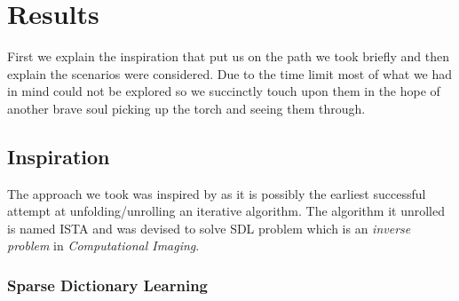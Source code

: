 \chapter{Results}

First we explain the inspiration that put us on the path we took briefly and then explain the scenarios were considered. 
Due to the time limit most of what we had in mind could not be explored so we succinctly touch upon them in the hope of another 
brave soul picking up the torch and seeing them through.  

\section{Inspiration}

The approach we took was inspired by \cite{Gregor2010} as it is possibly the earliest successful attempt at unfolding/unrolling 
an iterative algorithm. The algorithm it unrolled is named \ac{ISTA}\cite{Daubechies2003} and was devised to solve \ac{SDL} 
problem which is an \emph{inverse problem} in \emph{Computational Imaging}.

\subsection{Sparse Dictionary Learning}


